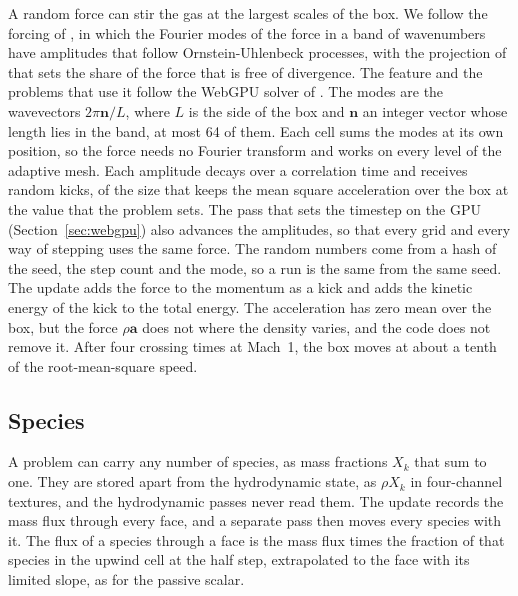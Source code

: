 \documentclass[twocolumn]{aastex701}
\begin{document}
A random force can stir the gas at the largest scales of the box. We follow the forcing of \citet{EswaranPope1988}, in which the Fourier modes of the force in a band of wavenumbers have amplitudes that follow Ornstein-Uhlenbeck processes, with the projection of \citet{Federrath2010b} that sets the share of the force that is free of divergence. The feature and the problems that use it follow the WebGPU solver of \citet{Mallet2026}. The modes are the wavevectors $2\pi\mathbf{n}/L$, where $L$ is the side of the box and $\mathbf{n}$ an integer vector whose length lies in the band, at most 64 of them. Each cell sums the modes at its own position, so the force needs no Fourier transform and works on every level of the adaptive mesh. Each amplitude decays over a correlation time and receives random kicks, of the size that keeps the mean square acceleration over the box at the value that the problem sets. The pass that sets the timestep on the GPU (Section~\ref{sec:webgpu}) also advances the amplitudes, so that every grid and every way of stepping uses the same force. The random numbers come from a hash of the seed, the step count and the mode, so a run is the same from the same seed. The update adds the force to the momentum as a kick and adds the kinetic energy of the kick to the total energy. The acceleration has zero mean over the box, but the force $\rho\mathbf{a}$ does not where the density varies, and the code does not remove it. After four crossing times at Mach~1, the box moves at about a tenth of the root-mean-square speed.

\subsection{Species}
\label{sec:species}

A problem can carry any number of species, as mass fractions $X_k$ that sum to one. They are stored apart from the hydrodynamic state, as $\rho X_k$ in four-channel textures, and the hydrodynamic passes never read them. The update records the mass flux through every face, and a separate pass then moves every species with it. The flux of a species through a face is the mass flux times the fraction of that species in the upwind cell at the half step, extrapolated to the face with its limited slope, as for the passive scalar.
\end{document}
